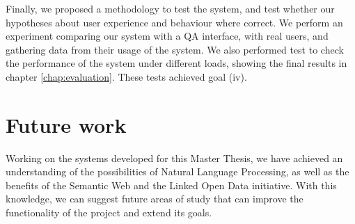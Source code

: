 Finally, we proposed a methodology to test the system, and test whether our hypotheses about user experience and behaviour where correct. We perform an experiment comparing our system with a QA interface, with real users, and gathering data from their usage of the system. We also performed test to check the performance of the system under different loads, showing the final results in chapter \ref{chap:evaluation}. These tests achieved goal (iv).


\section{Future work}

Working on the systems developed for this Master Thesis, we have achieved an understanding of the possibilities of Natural Language Processing, as well as the benefits of the Semantic Web and the Linked Open Data initiative. With this knowledge, we can suggest future areas of study that can improve the functionality of the project and extend its goals.

